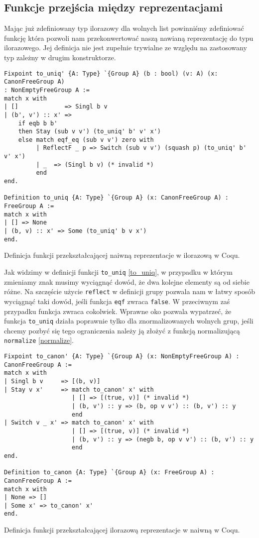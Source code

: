 \subsection{Funkcje przejścia między reprezentacjami}
Mając już zdefiniowany typ ilorazowy dla wolnych list powinniśmy zdefiniować funkcję która pozwoli nam przekonwertować naszą nawianą reprezentację do typu ilorazowego. Jej definicja nie jest zupełnie trywialne ze względu na zastosowany typ zależny w drugim konstruktorze.
\begin{code}
\begin{verbatim}
Fixpoint to_uniq' {A: Type} `{Group A} (b : bool) (v: A) (x: CanonFreeGroup A) 
: NonEmptyFreeGroup A :=
match x with 
| []             => Singl b v
| (b', v') :: x' => 
    if eqb b b' 
    then Stay (sub v v') (to_uniq' b' v' x')
    else match eqf_eq (sub v v') zero with
         | ReflectF _ p => Switch (sub v v') (squash p) (to_uniq' b' v' x')
         | _  => (Singl b v) (* invalid *)
         end
end.

Definition to_uniq {A: Type} `{Group A} (x: CanonFreeGroup A) : FreeGroup A :=
match x with
| [] => None
| (b, v) :: x' => Some (to_uniq' b v x')
end.
\end{verbatim}
\caption{Definicja funkcji przekształcającej naiwną reprezentacje w ilorazową w Coqu.}
\label{to_uniq}
\end{code}

Jak widzimy w definicji funkcji \texttt{to_uniq} \ref{to_uniq}, w przypadku w którym zmieniamy znak musimy wyciągnąć dowód, że dwa kolejne elementy są od siebie różne. Na szczęście użycie \texttt{reflect} w definicji grupy pozwala nam w łatwy sposób wyciągnąć taki dowód, jeśli funkcja \texttt{eqf} zwraca \texttt{false}. W przeciwnym zaś przypadku funkcja zwraca cokolwiek. Wprawne oko pozwala wypatrzeć, że funkcja \texttt{to_uniq} działa poprawnie tylko dla znormalizowanych wolnych grup, jeśli chcemy pozbyć się tego ograniczenia należy ją złożyć z funkcją normalizującą \texttt{normalize} \ref{normalize}.

\begin{code}
\begin{verbatim}
Fixpoint to_canon' {A: Type} `{Group A} (x: NonEmptyFreeGroup A) : CanonFreeGroup A :=
match x with 
| Singl b v     => [(b, v)]
| Stay v x'     => match to_canon' x' with
                   | [] => [(true, v)] (* invalid *)
                   | (b, v') :: y => (b, op v v') :: (b, v') :: y
                   end
| Switch v _ x' => match to_canon' x' with
                   | [] => [(true, v)] (* invalid *)
                   | (b, v') :: y => (negb b, op v v') :: (b, v') :: y
                   end
end.

Definition to_canon {A: Type} `{Group A} (x: FreeGroup A) : CanonFreeGroup A :=
match x with
| None => []
| Some x' => to_canon' x'
end.
\end{verbatim}
\caption{Definicja funkcji przekształcającej ilorazową reprezentacje w naiwną w Coqu.}
\label{to_canon}
\end{code}

